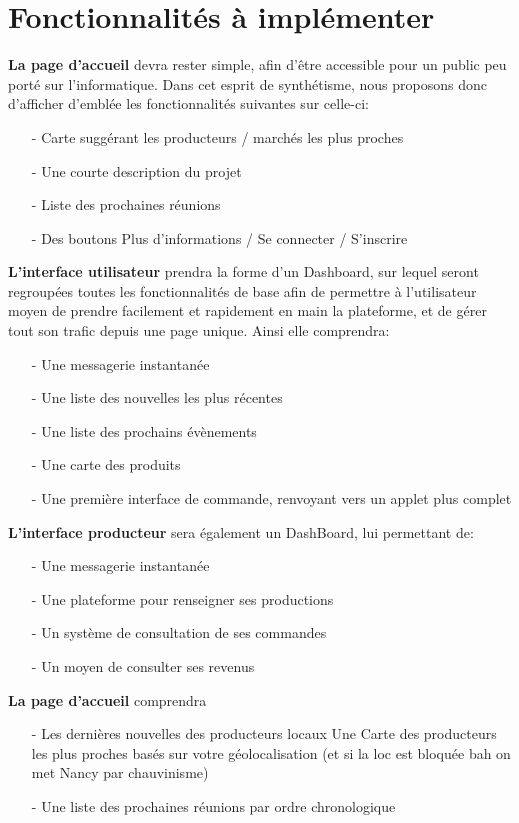 \chapter*{Fonctionnalités à implémenter}
\textbf{La page d'accueil} devra rester simple, afin d’être accessible pour un public peu porté sur l’informatique. Dans cet esprit de synthétisme, nous proposons donc d’afficher d’emblée les fonctionnalités suivantes sur celle-ci:
\begin{itemize}
	\item[-] Carte suggérant les producteurs / marchés les plus proches
	\item[-] Une courte description du projet
	\item[-] Liste des prochaines réunions
	\item[-] Des boutons Plus d’informations / Se connecter / S’inscrire
\end{itemize}

\textbf{L’interface utilisateur} prendra la forme d’un Dashboard, sur lequel seront regroupées toutes les fonctionnalités de base afin de permettre à l’utilisateur moyen de prendre facilement et rapidement en main la plateforme, et de gérer tout son trafic depuis une page unique. Ainsi elle comprendra:
\begin{itemize}
	\item[-] Une messagerie instantanée
	\item[-] Une liste des nouvelles les plus récentes
	\item[-] Une liste des prochains évènements
	\item[-] Une carte des produits
	\item[-] Une première interface de commande, renvoyant vers un applet plus complet
\end{itemize}

\textbf{L’interface producteur} sera également un DashBoard, lui permettant de:
\begin{itemize}
	\item[-] Une messagerie instantanée
	\item[-] Une plateforme pour renseigner ses productions
	\item[-] Un système de consultation de ses commandes
	\item[-] Un moyen de consulter ses revenus
\end{itemize}

\textbf{La page d'accueil} comprendra
\begin{itemize}
	\item[-] Les dernières nouvelles des producteurs locaux
Une Carte des producteurs les plus proches basés sur votre géolocalisation (et si la loc est bloquée bah on met Nancy par chauvinisme)
	\item[-] Une liste des prochaines réunions par ordre chronologique
\end{itemize}

